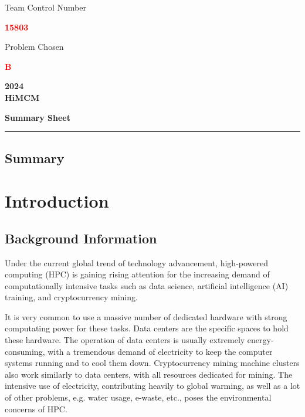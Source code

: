 \documentclass[12pt]{article}
\renewcommand{\em}[1]{{\huge \textbf{\textcolor{red}{#1}}}}
\begin{document}
\thispagestyle{empty}

\begin{center}
	Team Control Number
	
	\em{15803}

	Problem Chosen
	
	\em{B}

	\textbf{\large 2024} \\
	\textbf{HiMCM}

	\textbf{\small Summary Sheet}
\end{center}

\noindent\rule{\textwidth}{1pt}

\begin{center}
	\section*{Summary}
\end{center}

\newpage

{\center\tableofcontents}

\newpage

\section{Introduction}

\subsection{Background Information}

Under the current global trend of technology advancement, high-powered computing (HPC) is gaining rising attention for the increasing demand of computationally intensive tasks such as data science, artificial intelligence (AI) training, and cryptocurrency mining.

It is very common to use a massive number of dedicated hardware with strong computating power for these tasks. Data centers are the specific spaces to hold these hardware. The operation of data centers is usually extremely energy-consuming, with a tremendous demand of electricity to keep the computer systems running and to cool them down. Cryptocurrency mining machine clusters also work similarly to data centers, with all resources dedicated for mining. The intensive use of electricity, contributing heavily to global warming, as well as a lot of other problems, e.g. water usage, e-waste, etc., poses the environmental concerns of HPC.
\end{document}
